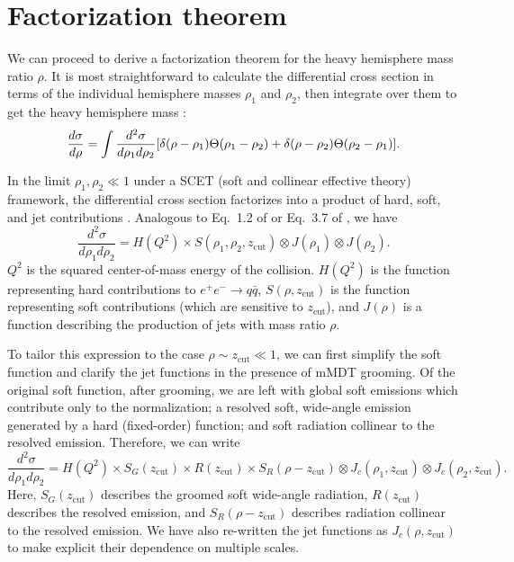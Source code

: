 \documentclass[11pt,twoside,reqno]{amsart}
\theoremstyle{plain}
\theoremstyle{remark}
\theoremstyle{definition}
\theoremstyle{remark}
\theoremstyle{definition}
\theoremstyle{definition}
\newcommand{\zcut}{z_\mathrm{cut}}
\begin{document}
\section{Factorization theorem}

	We can proceed to derive a factorization theorem for the heavy hemisphere mass ratio $\rho$. It is most straightforward to calculate the differential cross section in terms of the individual hemisphere masses $\rho_1$ and $\rho_2$, then integrate over them to get the heavy hemisphere mass \cite{chien_resummation_2010}:
	\begin{equation}
		\frac{d\sigma}{d\rho} = \int \frac{d^2\sigma}{d\rho_1 d\rho_2} \qty[\delta(\rho - \rho_1) \Theta(\rho_1 - \rho_2) + \delta(\rho - \rho_2) \Theta(\rho_2 - \rho_1)].
	\end{equation}

	In the limit $\rho_1, \rho_2 \ll 1$ under a SCET (soft and collinear effective theory) framework, the differential cross section factorizes into a product of hard, soft, and jet contributions \cite{frye_factorization_2016,ellis_jet_2010}. Analogous to Eq.\ 1.2 of \cite{ellis_jet_2010} or Eq.\ 3.7 of \cite{frye_factorization_2016}, we have
	\begin{equation}
		\frac{d^2\sigma}{d\rho_1 d\rho_2} = H(Q^2) \times S(\rho_1, \rho_2, \zcut) \otimes J(\rho_1) \otimes J(\rho_2).
	\end{equation}
	$Q^2$ is the squared center-of-mass energy of the collision. $H(Q^2)$ is the function representing hard contributions to $e^+ e^- \to q\bar q$, $S(\rho, \zcut)$ is the function representing soft contributions (which are sensitive to $\zcut$), and $J(\rho)$ is a function describing the production of jets with mass ratio $\rho$.

	To tailor this expression to the case $\rho \sim \zcut \ll 1$, we can first simplify the soft function and clarify the jet functions in the presence of mMDT grooming. Of the original soft function, after grooming, we are left with global soft emissions which contribute only to the normalization; a resolved soft, wide-angle emission generated by a hard (fixed-order) function; and soft radiation collinear to the resolved emission. Therefore, we can write
	\begin{equation}
		\frac{d^2\sigma}{d\rho_1 d\rho_2} = H(Q^2) \times S_G(\zcut) \times R(\zcut) \times S_R(\rho - \zcut) \otimes J_{c}(\rho_1, \zcut) \otimes J_{c}(\rho_2, \zcut).
	\end{equation}
	Here, $S_G(\zcut)$ describes the groomed soft wide-angle radiation, $R(\zcut)$ describes the resolved emission, and $S_R(\rho - \zcut)$ describes radiation collinear to the resolved emission. We have also re-written the jet functions as $J_c(\rho, \zcut)$ to make explicit their dependence on multiple scales.
\end{document}
